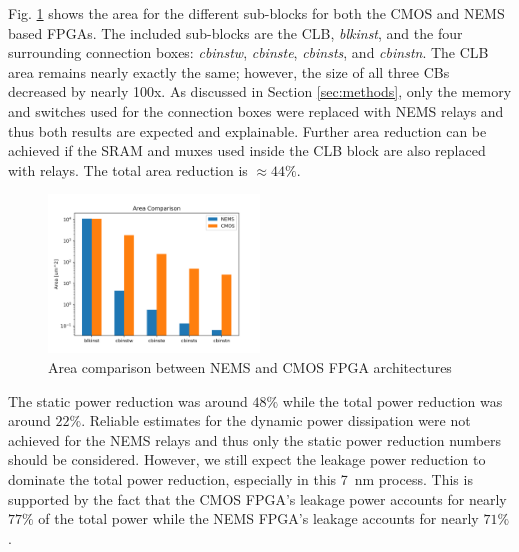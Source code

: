 \documentclass[twoside,twocolumn]{article}
\begin{document}
Fig. \ref{fig:area} shows the area for the different sub-blocks
for both the CMOS and NEMS based FPGAs. The included sub-blocks are the CLB,
\textit{blkinst}, and the four surrounding connection boxes: \textit{cbinstw}, 
\textit{cbinste}, \textit{cbinsts}, and \textit{cbinstn}. The CLB area remains 
nearly exactly the same; however, the size of all three CBs decreased by nearly 
100x. As discussed in Section \ref{sec:methods}, only the memory and switches
used for the connection boxes were replaced with NEMS relays and thus both 
results are expected and explainable. Further area reduction can be achieved
if the SRAM and muxes used inside the CLB block are also replaced with relays.
The total area reduction is $\approx 44\%$. 

\begin{figure}[!hbt]
    \includegraphics[width=0.5\textwidth]{figs/area_comparison.png}
    \centering
    \caption{Area comparison between NEMS and CMOS FPGA architectures}
    \label{fig:area}
\end{figure}

The static power reduction was around $48\%$ while the total power reduction
was around $22\%$. Reliable estimates for the dynamic power dissipation were 
not achieved for the NEMS relays and thus only the static power reduction numbers 
should be considered. However, we still expect the leakage power reduction to dominate 
the total power reduction, especially in this \SI{7}{\nano\meter} process. This is
supported by the fact that the CMOS FPGA's leakage power accounts for nearly $77\%$ 
of the total power while the NEMS FPGA's leakage accounts for nearly $71\%$.

\end{document}

